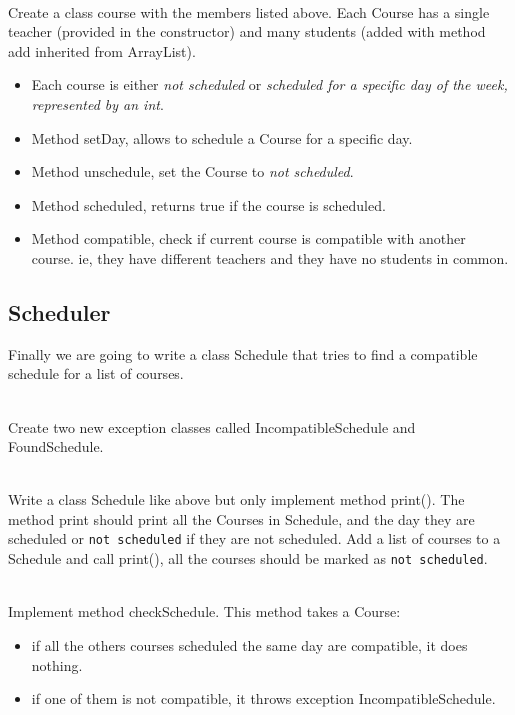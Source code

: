 \documentclass{exercices}
\begin{document}
\begin{exercice}\\
  Create a class course with the members listed above.
  Each Course has a single teacher (provided in the constructor) and many students (added with method
  add inherited from ArrayList).
  \begin{itemize}
  \item
  Each course is either \emph{not scheduled} or \emph{scheduled for a specific day of the week, represented by an int}.
  \item
  Method setDay, allows to schedule a Course for a specific day.
  \item
  Method unschedule, set the Course to \emph{not scheduled}.
  \item
  Method scheduled, returns true if the course is scheduled.
  \item
  Method compatible, check if current course is compatible with another course. ie, they have different teachers and they have no students in common.
  \end{itemize}
\end{exercice}

\subsection{Scheduler}
Finally we are going to write a class Schedule that tries to find a compatible schedule for a list of courses.

\begin{exercice}\\
Create two new exception classes called IncompatibleSchedule and FoundSchedule.
\end{exercice}


\begin{exercice}\\
Write a class Schedule like above but only implement method print().
The method print should print all the Courses in Schedule, and the day they are
scheduled or \verb!not scheduled! if they are not scheduled.
Add a list of courses to a Schedule and call print(), all the courses should be marked
as \verb!not scheduled!.
\end{exercice}

\begin{exercice}\\
Implement method checkSchedule.
This method takes a Course:
\begin{itemize}
\item if all the others courses scheduled the same day are compatible, it does nothing.
\item if one of them is not compatible, it throws exception IncompatibleSchedule.
\end{itemize}
\end{exercice}
\end{document}
